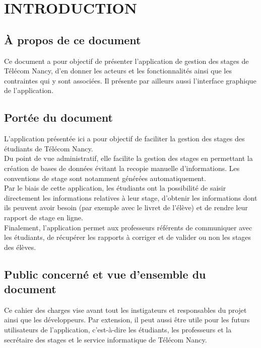 \documentclass{scrreprt}
\begin{document}
\chapter{INTRODUCTION}

\section{À propos de ce document}
\hspace{1cm}Ce document a pour objectif de présenter l'application de gestion des stages de Télécom Nancy, d'en donner les acteurs et les fonctionnalités ainsi que les contraintes qui y sont associées. Il présente par ailleurs aussi l'interface graphique de l'application.

\section{Portée du document}
\hspace{1cm}L'application présentée ici a pour objectif de faciliter la gestion des stages des étudiants de Télécom Nancy.\\

\hspace{0.6cm}Du point de vue administratif, elle facilite la gestion des stages en permettant la création de bases de données évitant la recopie manuelle d'informations. Les conventions de stage sont notamment générées automatiquement.\\

\hspace{0.6cm}Par le biais de cette application, les étudiants ont la possibilité de saisir directement les informations relatives à leur stage, d'obtenir les informations dont ils peuvent avoir besoin (par exemple avec le livret de l'élève) et de rendre leur rapport de stage en ligne.\\

\hspace{0.6cm}Finalement, l'application permet aux professeurs référents de communiquer avec les étudiants, de récupérer les rapports à corriger et de valider ou non les stages des élèves.

\section{Public concerné et vue d'ensemble du document }

\hspace{1cm}Ce cahier des charges vise avant tout les instigateurs et responsables du projet ainsi que les développeurs. Par extension, il peut aussi être utile pour les futurs utilisateurs de l'application, c'est-à-dire les étudiants, les professeurs et la secrétaire des stages et le service informatique de Télécom Nancy.\\
\end{document}

